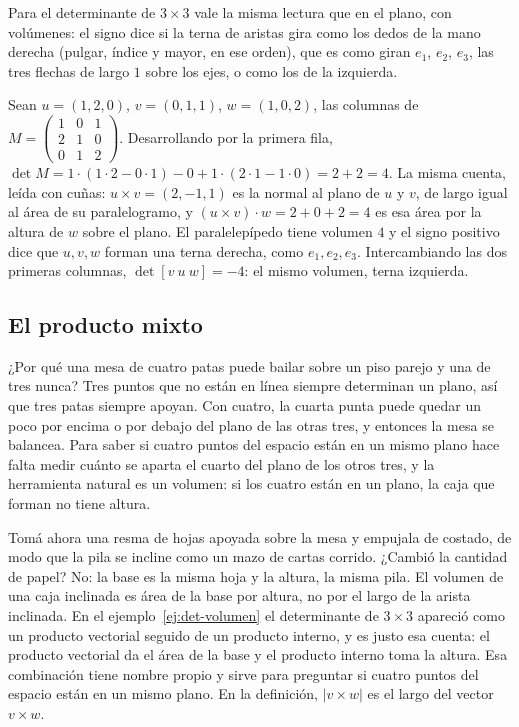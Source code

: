 Para el determinante de \(3\times3\) vale la misma lectura que en el plano, con volúmenes:
el signo dice si la terna de aristas gira como los dedos de la mano derecha (pulgar, índice y
mayor, en ese orden), que es como giran \(e_1\), \(e_2\), \(e_3\), las tres flechas de largo
\(1\) sobre los ejes, o como los de la izquierda.

\begin{ejemplo}\label{ej:det-volumen}
Sean \(u=(1,2,0)\), \(v=(0,1,1)\), \(w=(1,0,2)\), las columnas de
\(M=\left(\begin{smallmatrix}1&0&1\\2&1&0\\0&1&2\end{smallmatrix}\right)\). Desarrollando por la primera fila,
\(\det M=1\cdot(1\cdot2-0\cdot1)-0+1\cdot(2\cdot1-1\cdot0)=2+2=4\). La misma cuenta, leída
con cuñas: \(u\times v=(2,-1,1)\) es la normal al plano de \(u\) y \(v\), de largo igual al
área de su paralelogramo, y \((u\times v)\cdot w=2+0+2=4\) es esa área por la altura de \(w\)
sobre el plano. El paralelepípedo tiene volumen \(4\) y el signo positivo dice que
\(u,v,w\) forman una terna derecha, como \(e_1,e_2,e_3\). Intercambiando las dos primeras
columnas, \(\det[v\ u\ w]=-4\): el mismo volumen, terna izquierda.
\end{ejemplo}

\subsection{El producto mixto}\label{sec:producto-mixto}

¿Por qué una mesa de cuatro patas puede bailar sobre un piso parejo y una de tres nunca?
Tres puntos que no están en línea siempre determinan un plano, así que tres patas siempre
apoyan. Con cuatro, la cuarta punta puede quedar un poco por encima o por debajo del plano de
las otras tres, y entonces la mesa se balancea. Para saber si cuatro puntos del espacio están
en un mismo plano hace falta medir cuánto se aparta el cuarto del plano de los otros tres, y
la herramienta natural es un volumen: si los cuatro están en un plano, la caja que forman no
tiene altura.

Tomá ahora una resma de hojas apoyada sobre la mesa y empujala de costado, de modo que la pila
se incline como un mazo de cartas corrido. ¿Cambió la cantidad de papel?
No: la base es la misma hoja y la altura, la misma pila. El volumen de una caja inclinada es
área de la base por altura, no por el largo de la arista inclinada. En el
ejemplo~\ref{ej:det-volumen} el determinante de \(3\times3\) apareció como un producto
vectorial seguido de un producto interno, y es justo esa cuenta: el producto vectorial da el
área de la base y el producto interno toma la altura. Esa combinación tiene nombre propio y
sirve para preguntar si cuatro puntos del espacio están en un mismo plano. En la definición,
\(\lvert v\times w\rvert\) es el largo del vector \(v\times w\).

